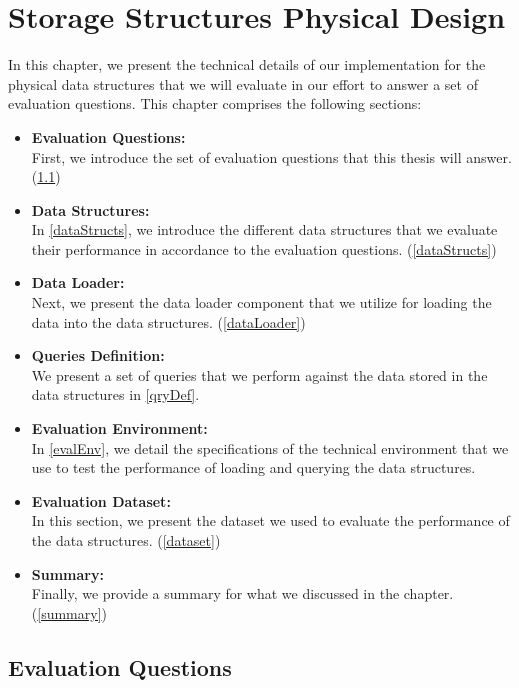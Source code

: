 {\chapter{Storage Structures Physical Design}
\label{chap:PhysicalDesign}
In this chapter, we present the technical details of our implementation for the physical data structures that we will evaluate in our effort to answer a set of evaluation questions. This chapter comprises the following sections:


\begin{itemize}  
\item \textbf{Evaluation Questions:}\\
First, we introduce the set of evaluation questions that this thesis will answer. (\ref{evalQests})
\item\textbf{Data Structures:}\\
In \ref{dataStructs}, we introduce the different data structures that we evaluate their performance in accordance to the evaluation questions. (\ref{dataStructs})
\item \textbf{Data Loader:}\\
Next, we present the data loader component that we utilize for loading the data into the data structures. (\ref{dataLoader})
\item \textbf{Queries Definition:}\\
We present a set of queries that we perform against the data stored in the data structures in \ref{qryDef}.
\item \textbf{Evaluation Environment:}\\
In \ref{evalEnv}, we detail the specifications of the technical environment that we use to test the performance of loading and querying the data structures. 
\item \textbf{Evaluation Dataset:}\\
In this section, we present the dataset we used to evaluate the performance of the data structures. (\ref{dataset})
\item \textbf{Summary:}\\
Finally, we provide a summary for what we discussed in the chapter. (\ref{summary})
\end{itemize}
 
\section{Evaluation Questions}
\label{evalQests}


}
